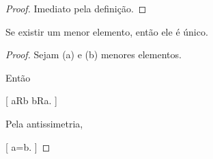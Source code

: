 \documentclass[../../main]{subfiles}
\begin{document}
\begin{proof}

	Imediato pela definição.

\end{proof}

\begin{prop}
	\label{prop:matematica:relacoes:unicidade-menor}

	Se existir um menor elemento, então ele é único.

\end{prop}

\begin{proof}

	Sejam (a) e (b) menores elementos.

	Então

	[
	aRb
	\quad{}\quad
	bRa.
	]

	Pela antissimetria,

	[
			a=b.
		]

\end{proof}
\end{document}
